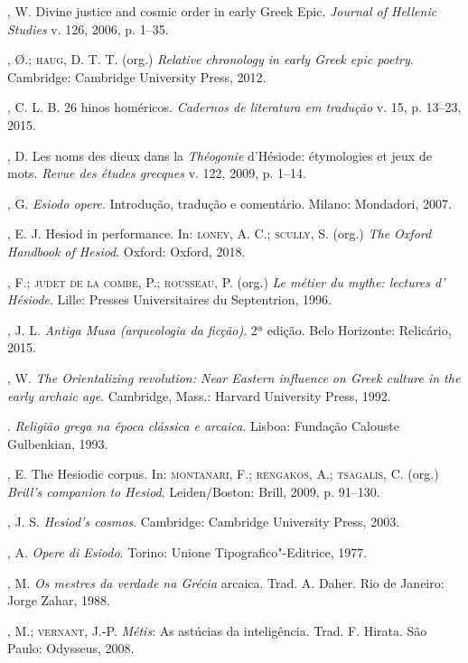 \begin{bibliohedra}
, W. Divine justice and cosmic order in early Greek Epic.
\emph{Journal of Hellenic Studies} v. 126, 2006, p. 1--35.

, Ø.; \textsc{haug}, D. T. T. (org.) \emph{Relative chronology in early
Greek epic poetry}. Cambridge: Cambridge University Press, 2012.

, C. L. B. 26 hinos homéricos. \emph{Cadernos de literatura em
tradução} v. 15, p. 13--23, 2015.

, D. Les noms des dieux dans la \emph{Théogonie} d'Hésiode:
étymologies et jeux de mots. \emph{Revue des études grecques} v. 122,
2009, p. 1--14.

, G. \emph{Esiodo opere}. Introdução, tradução e comentário.
Milano: Mondadori, 2007.

, E. J. Hesiod in performance. In: \textsc{loney}, A. C.; \textsc{scully}, S. (org.)
\emph{The Oxford Handbook of Hesiod}. Oxford: Oxford, 2018.

, F.; \textsc{judet de la combe}, P.; \textsc{rousseau}, P. (org.) \emph{Le métier
du mythe: lectures d' Hésiode}. Lille: Presses Universitaires du
Septentrion, 1996.

, J. L. \emph{Antiga Musa (arqueologia da ficção)}. 2ª edição.
Belo Horizonte: Relicário, 2015.

, W. \emph{The Orientalizing revolution: Near Eastern influence
on Greek culture in the early archaic age}. Cambridge, Mass.: Harvard
University Press, 1992.

\titidem. \emph{Religião grega na época clássica e arcaica}. Lisboa: Fundação
Calouste Gulbenkian, 1993.

, E. The Hesiodic corpus. In: \textsc{montanari}, F.; \textsc{rengakos}, A.;
\textsc{tsagalis}, C. (org.) \emph{Brill's companion to Hesiod}. Leiden/Boston:
Brill, 2009, p. 91--130.

, J. S. \emph{Hesiod's cosmos}. Cambridge: Cambridge University
Press, 2003.

, A. \emph{Opere di Esiodo}. Torino: Unione Tipografico"-Editrice,
1977.

, M. \emph{Os mestres da verdade na Grécia} arcaica. Trad. A.
Daher. Rio de Janeiro: Jorge Zahar, 1988.

, M.; \textsc{vernant}, J.-P. \emph{Métis}: As astúcias da inteligência.
Trad. F. Hirata. São Paulo: Odysseus, 2008.


\end{bibliohedra}
